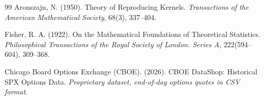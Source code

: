 \documentclass[12pt,oneside]{report}
\theoremstyle{definition}
\theoremstyle{remark}
\begin{document}
\begin{thebibliography}{99}
Aronszajn, N. (1950).
Theory of Reproducing Kernels.
\textit{Transactions of the American Mathematical Society}, 68(3), 337--404.

Fisher, R. A. (1922).
On the Mathematical Foundations of Theoretical Statistics.
\textit{Philosophical Transactions of the Royal Society of London. Series A}, 222(594--604), 309--368.

Chicago Board Options Exchange (CBOE). (2026).
CBOE DataShop: Historical SPX Options Data.
\textit{Proprietary dataset, end-of-day options quotes in CSV format}.

\end{thebibliography}
\end{document}
